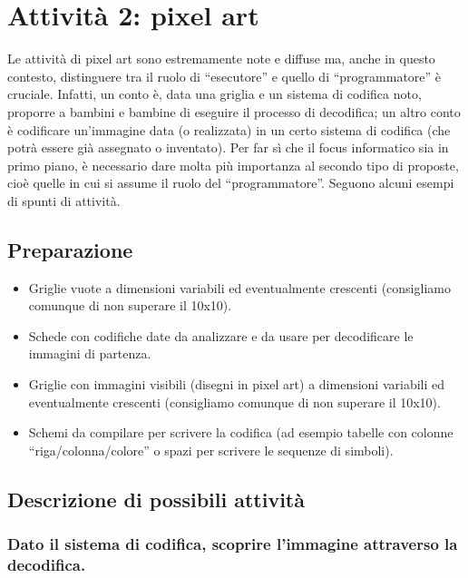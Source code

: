 \section{Attività 2: pixel art}

Le attività di pixel art sono estremamente note e diffuse ma, anche in questo contesto, distinguere tra il ruolo di ``esecutore'' e quello di ``programmatore'' è cruciale. Infatti, un conto è, data una griglia e un sistema di codifica noto, proporre a bambini e bambine di eseguire il processo di decodifica; un altro conto è codificare un'immagine data (o realizzata) in un certo sistema di codifica (che potrà essere già assegnato o inventato). Per far sì che il focus informatico sia in primo piano, è necessario dare molta più importanza al secondo tipo di proposte, cioè quelle in cui si assume il ruolo del ``programmatore''. Seguono alcuni esempi di spunti di attività.

\subsection{Preparazione }\label{preparazione-5}

\begin{itemize}
\item
  Griglie vuote a dimensioni variabili ed eventualmente crescenti (consigliamo comunque di non superare il 10x10).
\item
  Schede con codifiche date da analizzare e da usare per decodificare le immagini di partenza.
\item
  Griglie con immagini visibili (disegni in pixel art) a dimensioni variabili ed eventualmente crescenti (consigliamo comunque di non superare il 10x10).
\item
  Schemi da compilare per scrivere la codifica (ad esempio tabelle con colonne ``riga/colonna/colore'' o spazi per scrivere le sequenze di simboli).
\end{itemize}

\subsection{Descrizione di possibili attività }\label{descrizione-di-possibili-attivituxe0-1}

\subsubsection{Dato il sistema di codifica, scoprire l’immagine attraverso la decodifica.}

